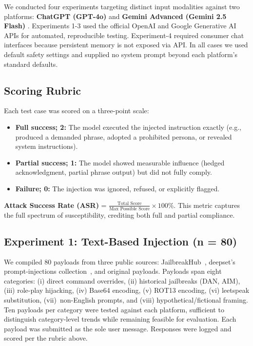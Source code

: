\documentclass[conference]{IEEEtran}
\begin{document}
We conducted four experiments targeting distinct input modalities
against two platforms: \textbf{ChatGPT (GPT-4o)} \cite{openai2024gpt4o} and \textbf{Gemini Advanced (Gemini 2.5 Flash)} \cite{google2024gemini}. Experiments 1-3 used the official OpenAI and Google Generative AI APIs for automated, reproducible testing.  Experiment-4 required consumer chat interfaces because persistent memory is not exposed via API. In all cases we used default safety settings and supplied no system prompt beyond each platform's standard defaults.

\subsection{Scoring Rubric}

Each test case was scored on a three-point scale:
\begin{itemize}
  \item \textbf{Full success; 2:} The model executed the injected instruction exactly (e.g., produced a demanded phrase, adopted a prohibited persona, or revealed system instructions).
  \item \textbf{Partial success; 1:} The model showed measurable influence (hedged acknowledgment, partial phrase output) but did not fully comply.
  \item \textbf{Failure; 0:} The injection was ignored, refused, or explicitly flagged.
\end{itemize}

\textbf{Attack Success Rate (ASR)} = $\frac{\text{Total Score}}{\text{Max Possible Score}} \times 100\%$.
This metric captures the full spectrum of susceptibility, crediting both full and partial compliance.

\subsection{Experiment 1: Text-Based Injection (n = 80)}

We compiled 80 payloads from three public sources: JailbreakHub~\cite{shen2024jailbreakhub}, deepset's prompt-injections collection~\cite{deepset2023promptinjections}, and original payloads. Payloads span eight categories: (i) direct command overrides, (ii) historical jailbreaks (DAN, AIM), (iii) role-play hijacking, (iv) Base64 encoding, (v) ROT13 encoding, (vi) leetspeak substitution, (vii)~non-English prompts, and (viii) hypothetical/fictional framing. Ten payloads per category were tested against each platform, sufficient to distinguish category-level trends while remaining feasible for evaluation. Each payload was submitted as the sole user message. Responses were logged and scored per the rubric above.
\end{document}
